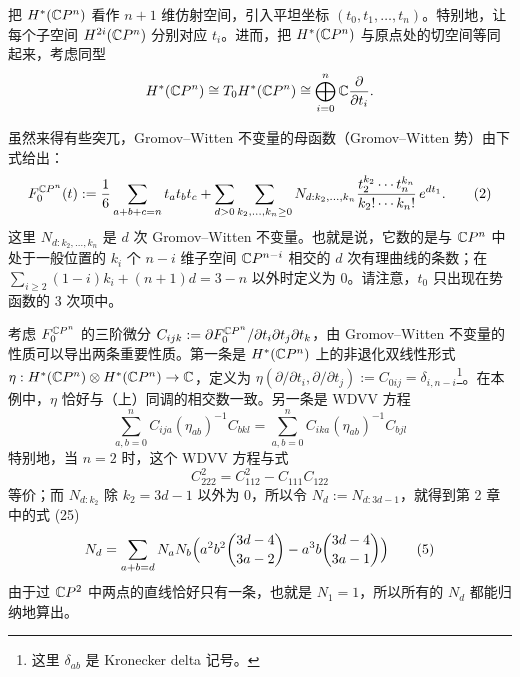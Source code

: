 把 $H^*(\mathbb{C}P^n)$ 看作 $n+1$ 维仿射空间，引入平坦坐标 $(t_0,t_1,\dots,t_n)$。特别地，让每个子空间 $H^{2i}(\mathbb{C}P^n)$ 分别对应 $t_i$。进而，把 $H^*(\mathbb{C}P^n)$ 与原点处的切空间等同起来，考虑同型
\[
  H^*(\mathbb{C}P^n)\cong T_0H^*(\mathbb{C}P^n)\cong\bigoplus_{i=0}^{n}\mathbb{C}\frac{\partial}{\partial t_i}.
\]

虽然来得有些突兀，Gromov--Witten 不变量的母函数（Gromov--Witten 势）由下式给出：
\begin{equation}
  F_0^{\mathbb{C}P^n}(t):=\frac{1}{6}\sum_{a+b+c=n}t_at_bt_c
  +\sum_{d>0}\sum_{k_2,\dots,k_n\ge 0}
  N_{d:k_2,\dots,k_n}\frac{t_2^{k_2}\cdots t_n^{k_n}}{k_2!\cdots k_n!}\,e^{dt_1}.
  \tag{2}
\end{equation}
这里 $N_{d:k_2,\dots,k_n}$ 是 $d$ 次 Gromov--Witten 不变量。也就是说，它数的是与 $\mathbb{C}P^n$ 中处于一般位置的 $k_i$ 个 $n-i$ 维子空间 $\mathbb{C}P^{n-i}$ 相交的 $d$ 次有理曲线的条数；在 $\sum_{i\ge 2}(1-i)k_i+(n+1)d=3-n$ 以外时定义为 0。请注意，$t_0$ 只出现在势函数的 3 次项中。

考虑 $F_0^{\mathbb{C}P^n}$ 的三阶微分 $C_{ijk}:=\partial F_0^{\mathbb{C}P^n}/\partial t_i\partial t_j\partial t_k$，由 Gromov--Witten 不变量的性质可以导出两条重要性质。第一条是 $H^*(\mathbb{C}P^n)$ 上的非退化双线性形式 $\eta:H^*(\mathbb{C}P^n)\otimes H^*(\mathbb{C}P^n)\to\mathbb{C}$，定义为 $\eta(\partial/\partial t_i,\partial/\partial t_j):=C_{0ij}=\delta_{i,n-i}$\footnote{这里 $\delta_{ab}$ 是 Kronecker delta 记号。}。在本例中，$\eta$ 恰好与（上）同调的相交数一致。另一条是 WDVV 方程
\begin{equation}
  \sum_{a,b=0}^{n}C_{ija}(\eta_{ab})^{-1}C_{bkl}
  =\sum_{a,b=0}^{n}C_{ika}(\eta_{ab})^{-1}C_{bjl}
  \tag{3}
\end{equation}
特别地，当 $n=2$ 时，这个 WDVV 方程与式
\begin{equation}
  C_{222}^{2}=C_{112}^{2}-C_{111}C_{122}
  \tag{4}
\end{equation}
等价；而 $N_{d:k_2}$ 除 $k_2=3d-1$ 以外为 0，所以令 $N_d:=N_{d:3d-1}$，就得到第 2 章中的式 (25)
\begin{equation}
  N_d=\sum_{a+b=d}N_aN_b\Bigl(a^2b^2\binom{3d-4}{3a-2}-a^3b\binom{3d-4}{3a-1}\Bigr)
  \tag{5}
\end{equation}
由于过 $\mathbb{C}P^2$ 中两点的直线恰好只有一条，也就是 $N_1=1$，所以所有的 $N_d$ 都能归纳地算出。

